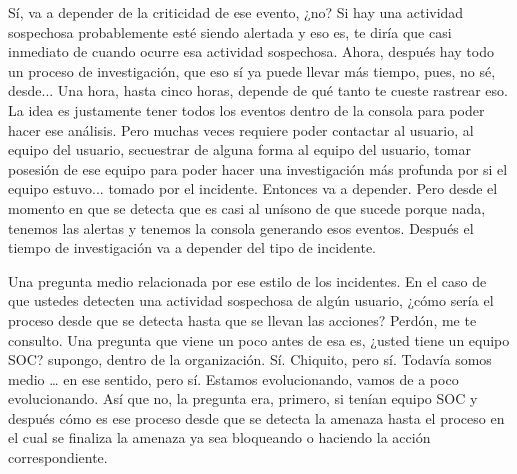 \begin{description}[leftmargin=0cm, labelsep=0.5cm]
    \item[\textbf{JACUBOVICH LUCIANA:}] Sí, va a depender de la criticidad de ese evento, ¿no? Si hay una actividad sospechosa probablemente esté siendo alertada y eso es, te diría que casi inmediato de cuando ocurre esa actividad sospechosa. Ahora, después hay todo un proceso de investigación, que eso sí ya puede llevar más tiempo, pues, no sé, desde... Una hora, hasta cinco horas, depende de qué tanto te cueste rastrear eso. La idea es justamente tener todos los eventos dentro de la consola para poder hacer ese análisis. Pero muchas veces requiere poder contactar al usuario, al equipo del usuario, secuestrar de alguna forma al equipo del usuario, tomar posesión de ese equipo para poder hacer una investigación más profunda por si el equipo estuvo... tomado por el incidente. Entonces va a depender. Pero desde el momento en que se detecta que es casi al unísono de que sucede porque nada, tenemos las alertas y tenemos la consola generando esos eventos. Después el tiempo de investigación va a depender del tipo de incidente.

    \item[\textbf{MUNTAABSKI FEDERICO:}] Una pregunta medio relacionada por ese estilo de los incidentes. En el caso de que ustedes detecten una actividad sospechosa de algún usuario, ¿cómo sería el proceso desde que se detecta hasta que se llevan las acciones? Perdón, me te consulto. Una pregunta que viene un poco antes de esa es, ¿usted tiene un equipo SOC? supongo, dentro de la organización. Sí. Chiquito, pero sí. Todavía somos medio … en ese sentido, pero sí. Estamos evolucionando, vamos de a poco evolucionando. Así que no, la pregunta era, primero, si tenían equipo SOC y después cómo es ese proceso desde que se detecta la amenaza hasta el proceso en el cual se finaliza la amenaza ya sea bloqueando o haciendo la acción correspondiente.


\end{description}
